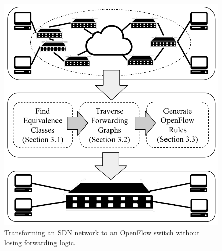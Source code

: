\begin{figure}[t]
\centering
\includegraphics[scale=.6]{figures/BigSimOverview.pdf}
\caption{Transforming an SDN network to an OpenFlow switch without losing forwarding logic.}
\label{Fig:BigSimOverview}
\end{figure}


